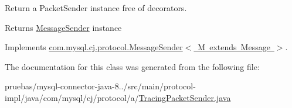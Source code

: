 Return a Packet\+Sender instance free of decorators.

\begin{DoxyReturn}{Returns}
\mbox{\hyperlink{interfacecom_1_1mysql_1_1cj_1_1protocol_1_1_message_sender}{Message\+Sender}} instance 
\end{DoxyReturn}


Implements \mbox{\hyperlink{interfacecom_1_1mysql_1_1cj_1_1protocol_1_1_message_sender_a8066931f03c2fa9cc705716fa10a4517}{com.\+mysql.\+cj.\+protocol.\+Message\+Sender$<$ M extends Message $>$}}.



The documentation for this class was generated from the following file\+:\begin{DoxyCompactItemize}
\item 
pruebas/mysql-\/connector-\/java-\/8../src/main/protocol-\/impl/java/com/mysql/cj/protocol/a/\mbox{\hyperlink{_tracing_packet_sender_8java}{Tracing\+Packet\+Sender.\+java}}\end{DoxyCompactItemize}
